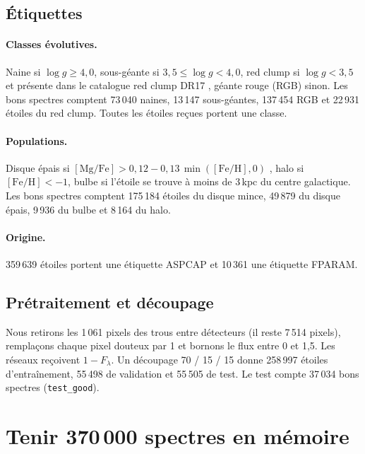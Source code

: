 \documentclass[11pt,a4paper]{article}
\begin{document}
\subsection{Étiquettes}

\paragraph{Classes évolutives.} Naine si $\log g \geq 4{,}0$, sous-géante si $3{,}5 \leq \log g < 4{,}0$, red clump si $\log g < 3{,}5$ et présente dans le catalogue red clump DR17 \cite{bovy2014}, géante rouge (RGB) sinon. Les bons spectres comptent 73\,040 naines, 13\,147 sous-géantes, 137\,454 RGB et 22\,931 étoiles du red clump. Toutes les étoiles reçues portent une classe.

\paragraph{Populations.} Disque épais si $[\text{Mg/Fe}] > 0{,}12 - 0{,}13\,\min([\text{Fe/H}], 0)$ \cite{weinberg2019}, halo si $[\text{Fe/H}] < -1$, bulbe si l'étoile se trouve à moins de 3\,kpc du centre galactique. Les bons spectres comptent 175\,184 étoiles du disque mince, 49\,879 du disque épais, 9\,936 du bulbe et 8\,164 du halo.

\paragraph{Origine.} 359\,639 étoiles portent une étiquette ASPCAP et 10\,361 une étiquette FPARAM.

\subsection{Prétraitement et découpage}

Nous retirons les 1\,061 pixels des trous entre détecteurs (il reste 7\,514 pixels), remplaçons chaque pixel douteux par 1 et bornons le flux entre 0 et 1,5. Les réseaux reçoivent $1 - F_\lambda$. Un découpage 70 / 15 / 15 donne 258\,997 étoiles d'entraînement, 55\,498 de validation et 55\,505 de test. Le test compte 37\,034 bons spectres (\texttt{test\_good}).

\section{Tenir 370\,000 spectres en mémoire}
\end{document}
